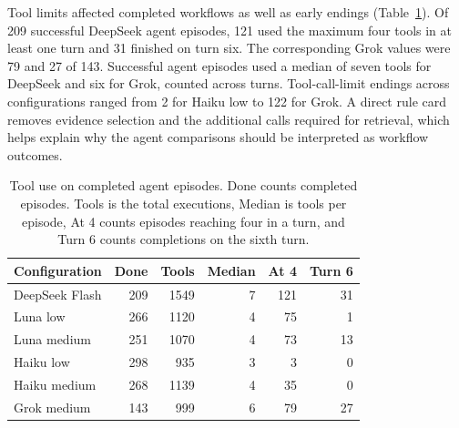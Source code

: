 \documentclass[10pt,letterpaper,twocolumn]{article}
\begin{document}
Tool limits affected completed workflows as well as early endings (Table~\ref{tab:tool-use}). Of 209 successful DeepSeek agent episodes, 121 used the maximum four tools in at least one turn and 31 finished on turn six. The corresponding Grok values were 79 and 27 of 143. Successful agent episodes used a median of seven tools for DeepSeek and six for Grok, counted across turns. Tool-call-limit endings across configurations ranged from 2 for Haiku low to 122 for Grok. A direct rule card removes evidence selection and the additional calls required for retrieval, which helps explain why the agent comparisons should be interpreted as workflow outcomes.

\begin{table}[!tb]
  \centering\small
  \setlength{\tabcolsep}{3pt}
  \caption{Tool use on completed agent episodes. Done counts completed episodes. Tools is the total executions, Median is tools per episode, At 4 counts episodes reaching four in a turn, and Turn 6 counts completions on the sixth turn.}
  \label{tab:tool-use}
  \begin{tabular*}{\columnwidth}{@{\extracolsep{\fill}}lrrrrr@{}}
    \toprule
    \textbf{Configuration} & \textbf{Done} & \textbf{Tools} & \textbf{Median} & \textbf{At 4} & \textbf{Turn 6} \\
    \midrule
    DeepSeek Flash & 209 & 1549 & 7 & 121 & 31 \\
    Luna low & 266 & 1120 & 4 & 75 & 1 \\
    Luna medium & 251 & 1070 & 4 & 73 & 13 \\
    Haiku low & 298 & 935 & 3 & 3 & 0 \\
    Haiku medium & 268 & 1139 & 4 & 35 & 0 \\
    Grok medium & 143 & 999 & 6 & 79 & 27 \\
    \bottomrule
  \end{tabular*}
\end{table}
\end{document}
